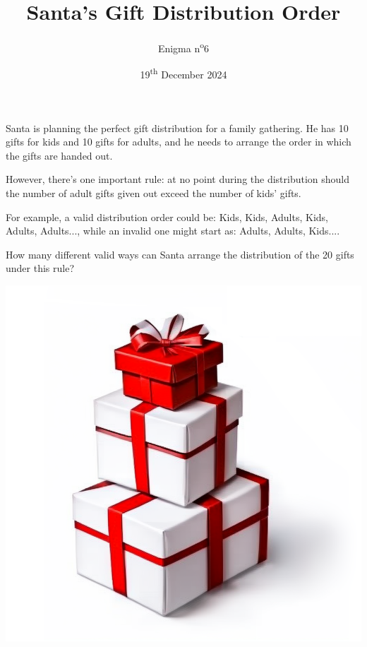 \documentclass[a4paper, top=10mm]{article}
\title{\textbf{\huge{Santa's Gift Distribution Order}}}
\author{Enigma n\textsuperscript{o}6}
\date{19\textsuperscript{th} December 2024}
\begin{document}
	\maketitle
	
	Santa is planning the perfect gift distribution for a family gathering. He has 10 gifts for kids and 10 gifts for adults, and he needs to arrange the order in which the gifts are handed out.
	
	However, there’s one important rule: at no point during the distribution should the number of adult gifts given out exceed the number of kids’ gifts.
	
	For example, a valid distribution order could be: Kids, Kids, Adults, Kids, Adults, Adults..., while an invalid one might start as: Adults, Adults, Kids....
	
	How many different valid ways can Santa arrange the distribution of the 20 gifts under this rule?
	
	\begin{center}
		\includegraphics[width=0.8\linewidth]{07presents.png}
	\end{center}
	
	
\end{document}
